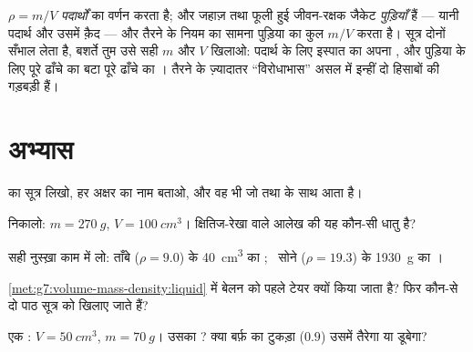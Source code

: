 \begin{remark}[भीड़ देखो, पुड़िया नहीं]\label{rem:g7:volume-mass-density:parcel}
$\rho = m/V$ \emph{पदार्थों} का वर्णन करता है; और जहाज़ तथा फूली हुई
जीवन-रक्षक जैकेट \emph{पुड़ियाँ} हैं --- यानी पदार्थ और उसमें क़ैद 
--- और तैरने के नियम का सामना पुड़िया का कुल $m/V$ करता है। सूत्र दोनों
सँभाल लेता है, बशर्ते तुम उसे सही $m$ और $V$ खिलाओ: पदार्थ के लिए
इस्पात का अपना , और पुड़िया के लिए पूरे ढाँचे का  बटा पूरे
ढाँचे का । तैरने के ज़्यादातर ``विरोधाभास'' असल में इन्हीं दो
हिसाबों की गड़बड़ी हैं।
\end{remark}

\section{अभ्यास}

\begin{exercise}[$\star$]\label{exo:g7:volume-mass-density:1}
 का सूत्र लिखो, हर अक्षर का नाम बताओ, और वह  भी जो 
तथा  के साथ आता है।
\end{exercise}

\begin{exercise}[$\star$]\label{exo:g7:volume-mass-density:2}
 निकालो: $m = \qty{270}{g}$, $V = \qty{100}{cm^3}$।
क्षितिज-रेखा वाले आलेख की यह कौन-सी धातु है?
\end{exercise}

\begin{exercise}[$\star$]\label{exo:g7:volume-mass-density:3}
सही नुस्ख़ा काम में लो: ताँबे ($\rho = 9.0$) के \qty{40}{cm^3} का
; \ सोने ($\rho = 19.3$) के \qty{1930}{g} का ।
\end{exercise}

\begin{exercise}[$\star$]\label{exo:g7:volume-mass-density:4}
\cref{met:g7:volume-mass-density:liquid} में बेलन को पहले टेयर क्यों
किया जाता है? फिर कौन-से दो पाठ सूत्र को खिलाए जाते हैं?
\end{exercise}

\begin{exercise}[$\star$]\label{exo:g7:volume-mass-density:5}
एक : $V = \qty{50}{cm^3}$, $m = \qty{70}{g}$। उसका ? क्या
बर्फ़ का टुकड़ा ($0.9$) उसमें तैरेगा या डूबेगा?
\end{exercise}


